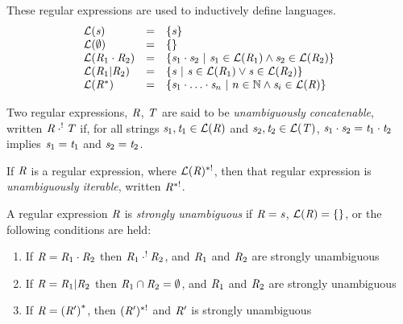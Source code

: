 \documentclass[numbers,10pt,preprint\ifanon ,nocopyrightspace\fi]{sigplanconf}
\begin{document}
These regular expressions are used to inductively define languages.
\[
  \begin{array}{lcl}
    \mathcal{L}(\mathit{s}) &=& \{\mathit{s}\}\\
    \mathcal{L}(\emptyset) &=& \{\}\\
    \mathcal{L}(\mathit{R}_1\cdot\mathit{R}_2) &=&
                                                      \{\mathit{s}_1\cdot\mathit{s}_2 ~|~
                                                      \mathit{s}_1\in\mathcal{L}(\mathit{R}_1) \wedge \mathit{s}_2\in\mathcal{L}(\mathit{R}_2)\}\\
    \mathcal{L}(\mathit{R}_1|\mathit{R}_2) &=&
                                                  \{\mathit{s} ~|~
                                                  \mathit{s}\in\mathcal{L}(\mathit{R}_1) \vee \mathit{s}\in\mathcal{L}(\mathit{R}_2)\}\\
    \mathcal{L}({\mathit{R}}^*) &=&
                                     \{\mathit{s}_1\cdot\ldots\cdot\mathit{s}_n ~|~
                                     n\in\mathbb{N} \wedge \mathit{s}_i\in\mathcal{L}(\mathit{R})\}
  \end{array}
\]

Two regular expressions, $\mathit{R}$, $\mathit{T}$ are said to be 
\textit{unambiguously concatenable}, written
$\mathit{R}\cdot^!\mathit{T}$ if, 
for all strings $\mathit{s}_1,\mathit{t}_1\in\mathcal{L}(\mathit{R})$ and
$\mathit{s}_2,\mathit{t}_2\in\mathcal{L}(\mathit{T})$,
$\mathit{s}_1\cdot\mathit{s}_2=\mathit{t}_1\cdot\mathit{t}_2$ implies
$\mathit{s}_1=\mathit{t}_1$ and $\mathit{s}_2=\mathit{t}_2$.

If $\mathit{R}$ is a regular expression, where $\mathcal{L}(\mathit{R})^{*!}$,
then that regular expression is \textit{unambiguously iterable},
written $\mathit{R}^{*!}$.

A regular expression $\mathit{R}$ is \textit{strongly unambiguous} if $\mathit{R} =
\mathit{s}$, $\mathcal{L}(\mathit{R}) = \{\}$, or the following conditions are held:
\begin{enumerate}
\item If $\mathit{R} = \mathit{R}_1 \cdot \mathit{R}_2$ then $\mathit{R}_1 \cdot^!
  \mathit{R}_2$, and $\mathit{R}_1$ and $\mathit{R}_2$ are strongly unambiguous
\item If $\mathit{R} = \mathit{R}_1 | \mathit{R}_2$ then $\mathit{R}_1 \cap \mathit{R}_2 =
  \emptyset$, and $\mathit{R}_1$ and $\mathit{R}_2$ are strongly unambiguous
\item If $\mathit{R} = {(\mathit{R}')}^*$, then $(\mathit{R}')^{*!}$ and
  $\mathit{R}'$ is strongly unambiguous
\end{enumerate}
\end{document}
